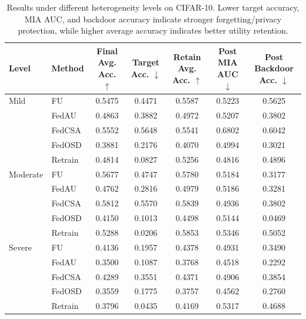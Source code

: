 \begin{table}[t]
\centering
\caption{Results under different heterogeneity levels on CIFAR-10. Lower target accuracy, MIA AUC, and backdoor accuracy indicate stronger forgetting/privacy protection, while higher average accuracy indicates better utility retention.}
\label{tab:heterogeneity_results}
\begin{tabular}{llccccc}
\toprule
Level & Method & Final Avg. Acc. $\uparrow$ & Target Acc. $\downarrow$ & Retain Avg. Acc. $\uparrow$ & Post MIA AUC $\downarrow$ & Post Backdoor Acc. $\downarrow$ \\
\midrule
Mild & FU & 0.5475 & 0.4471 & 0.5587 & 0.5223 & 0.5625 \\
 & FedAU & 0.4863 & 0.3882 & 0.4972 & 0.5207 & 0.3802 \\
 & FedCSA & 0.5552 & 0.5648 & 0.5541 & 0.6802 & 0.6042 \\
 & FedOSD & 0.3881 & 0.2176 & 0.4070 & 0.4994 & 0.3021 \\
 & Retrain & 0.4814 & 0.0827 & 0.5256 & 0.4816 & 0.4896 \\
\midrule
Moderate & FU & 0.5677 & 0.4747 & 0.5780 & 0.5184 & 0.3177 \\
 & FedAU & 0.4762 & 0.2816 & 0.4979 & 0.5186 & 0.3281 \\
 & FedCSA & 0.5812 & 0.5570 & 0.5839 & 0.4936 & 0.3802 \\
 & FedOSD & 0.4150 & 0.1013 & 0.4498 & 0.5144 & 0.0469 \\
 & Retrain & 0.5288 & 0.0206 & 0.5853 & 0.5346 & 0.5052 \\
\midrule
Severe & FU & 0.4136 & 0.1957 & 0.4378 & 0.4931 & 0.3490 \\
 & FedAU & 0.3500 & 0.1087 & 0.3768 & 0.4518 & 0.2292 \\
 & FedCSA & 0.4289 & 0.3551 & 0.4371 & 0.4906 & 0.3854 \\
 & FedOSD & 0.3559 & 0.1775 & 0.3757 & 0.4562 & 0.2760 \\
 & Retrain & 0.3796 & 0.0435 & 0.4169 & 0.5317 & 0.4688 \\
\bottomrule
\end{tabular}
\end{table}